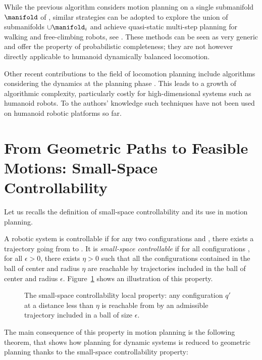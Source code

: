 While the previous algorithm considers motion planning on a single
submanifold $\manifold$ of \cspace, similar strategies can be adopted
to explore the union of submanifolds $\cup\manifold_{i}$ and achieve
quasi-static multi-step planning for walking and free-climbing robots,
see \cite{bretl2006motion, haus10}. These methods can
be seen as very generic and offer the property of probabilistic
completeness; they are not however directly applicable to humanoid
dynamically balanced locomotion.

Other recent contributions to the field of locomotion planning include
algorithms considering the dynamics at the planning phase
\cite{glassman2010quadratic, shkolnik2011bounding}. This leads to a
growth of algorithmic complexity, particularly costly for
high-dimensional systems such as humanoid robots. To the authors'
knowledge such techniques have not been used on humanoid robotic
platforms so far.

\section{From Geometric Paths to Feasible Motions: Small-Space Controllability}
\label{sec:ssc} 

Let us recalls the definition of small-space controllability and its
use in motion planning.

A robotic system is controllable if for any two configurations 
and , there exists a trajectory going from  to .  It is
\textit{small-space controllable} if for all configurations \config{}, for
all $\epsilon >0$, there exists $\eta >0$ such that all the
configurations contained in the ball of center \config{} and radius $\eta$
are reachable by trajectories included in the ball of center \config{} and
radius $\epsilon$. Figure~\ref{fig:ssc1} shows an illustration of this
property.

\begin{figure}
  \centering
  

  \caption{The small-space controllability local property:  any configuration $q'$ 
    at a distance less than
    $\eta$ is reachable from \config{} by an admissible trajectory included in
    a ball of size $\epsilon$.}
  \label{fig:ssc1}
\end{figure}

The main consequence of this property in motion planning is the
following theorem, that shows how planning for dynamic systems is
reduced to geometric planning thanks to the small-space
controllability property:

